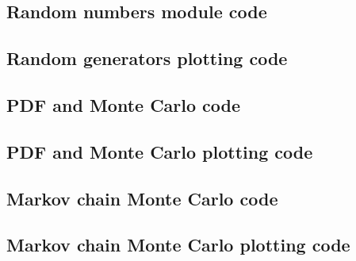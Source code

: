 \documentclass[twocolumn]{myarticle}
\begin{document}

\vspace{10pt}

\subsection{Random numbers module code}
\label{subsec:random_numbers_module_code}


\vspace{10pt}

\subsection{Random generators plotting code}
\label{subsec:random_generators_plotting_code}


\vspace{10pt}

\subsection{PDF and Monte Carlo code}
\label{subsec:pdf_and_monte_carlo_code}


\vspace{10pt}

\subsection{PDF and Monte Carlo plotting code}
\label{subsec:pdf_and_monte_carlo_plotting_code}


\vspace{10pt}

\subsection{Markov chain Monte Carlo code}
\label{subsec:markov_chain_monte_carlo_code}


\vspace{10pt}

\subsection{Markov chain Monte Carlo plotting code}
\label{subsec:markov_chain_monte_carlo_plotting_code}
\end{document}

